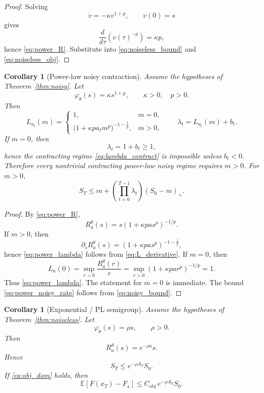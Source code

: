 \documentclass{article}
\newtheorem{corollary}[theorem]{Corollary}
\theoremstyle{definition}
\begin{document}
\begin{proof}
Solving
\[
\dot v=-\kappa v^{1+p},\qquad v(0)=s
\]
gives
\[
\frac{d}{d\tau}(v(\tau)^{-p})=\kappa p,
\]
hence \eqref{eq:power_R}. Substitute into \eqref{eq:noiseless_bound} and \eqref{eq:noiseless_obj}.
\end{proof}

\begin{corollary}[Power-law noisy contraction]
\label{cor:power_noisy}
Assume the hypotheses of Theorem~\ref{thm:noisy}.
Let
\[
\varphi_\theta(s)=\kappa s^{1+p},
\qquad
\kappa>0,\quad p>0.
\]
Then
\begin{equation}
L_{a_t}(m)
=
\begin{cases}
1, & m=0,\\[4pt]
\bigl(1+\kappa p a_t m^p\bigr)^{-1-\frac1p}, & m>0,
\end{cases}
\qquad
\lambda_t=L_{a_t}(m)+b_t.
\label{eq:power_lambda}
\end{equation}
If $m=0$, then
\[
\lambda_t=1+b_t\ge 1,
\]
hence the contracting regime \eqref{eq:lambda_contract} is impossible unless $b_t<0$.
Therefore every nontrivial contracting power-law noisy regime requires $m>0$.
For $m>0$,
\begin{equation}
S_T
\le
m+
\left(
\prod_{t=0}^{T-1}\lambda_t
\right)
(S_0-m)_+.
\label{eq:power_noisy_rate}
\end{equation}
\end{corollary}

\begin{proof}
By \eqref{eq:power_R},
\[
R_a^\theta(s)=s(1+\kappa p a s^p)^{-1/p}.
\]
If $m>0$, then
\[
\partial_sR_a^\theta(s)
=
(1+\kappa p a s^p)^{-1-\frac1p},
\]
hence \eqref{eq:power_lambda} follows from \eqref{eq:L_derivative}.
If $m=0$, then
\[
L_a(0)=\sup_{r>0}\frac{R_a^\theta(r)}{r}
=
\sup_{r>0}(1+\kappa p a r^p)^{-1/p}
=
1.
\]
Thus \eqref{eq:power_lambda}. The statement for $m=0$ is immediate. The bound \eqref{eq:power_noisy_rate} follows from \eqref{eq:noisy_bound}.
\end{proof}

\begin{corollary}[Exponential / PL semigroup]
\label{cor:exp}
Assume the hypotheses of Theorem~\ref{thm:noiseless}.
Let
\[
\varphi_\theta(s)=\rho s,
\qquad
\rho>0.
\]
Then
\begin{equation}
R_a^\theta(s)=e^{-\rho a}s.
\label{eq:exp_R}
\end{equation}
Hence
\begin{equation*}
S_T\le e^{-\rho A_T}S_0.
\end{equation*}
If \eqref{eq:obj_dom} holds, then
\begin{equation*}
\mathbb E[F(x_T)-F_\star]
\le
C_{\mathrm{obj}}\,e^{-\rho A_T}S_0.
\end{equation*}
\end{corollary}
\end{document}
